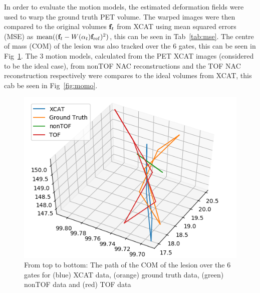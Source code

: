 \documentclass[journal]{IEEEtran}
\begin{document}
In order to evaluate the motion models, the estimated deformation fields were used to warp the ground truth PET volume. The warped images were then compared to the original volumes $\bold{f}_t$ from XCAT using mean squared errors (MSE) as $\mathrm{mean}((\bold{f}_t-W(\alpha_t) \bold{f}_\mathrm{ref})^2)$, this can be seen in Tab~\ref{tab:mse}. The centre of mass (COM) of the lesion was also tracked over the $6$ gates, this can be seen in Fig~\ref{fig:com_graph}. The $3$ motion models, calculated from the PET XCAT images (considered to be the ideal case), from nonTOF NAC reconstructions and the TOF NAC reconstruction respectively were compares to the ideal volumes from XCAT, this cab be seen in Fig~\ref{fig:momo}.

\begin{figure}[H]
    \centering
    \includegraphics[scale=0.5]{figures/com_graph.png}
    \caption{From top to bottom: The path of the COM of the lesion over the $6$ gates for (blue) XCAT data, (orange) ground truth data, (green) nonTOF data and (red) TOF data}
    \label{fig:com_graph}
\end{figure}
\end{document}
